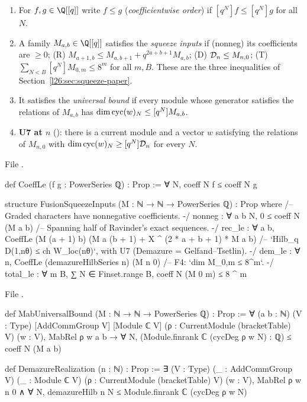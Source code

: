 \begin{definition}\label{l26:def:squeezeinputs}
\begin{enumerate}
\item[(a)] For $f,g\in\Q[[q]]$ write $f\le g$ (\emph{coefficientwise order}) if $[q^N]f\le[q^N]g$ for all $N$.
\item[(b)] A family $M_{a,b}\in\Q[[q]]$ satisfies the \emph{squeeze inputs} if (nonneg) its coefficients are $\ge0$;
(R) $M_{a+1,b}\le M_{a,b+1}+q^{2a+b+1}M_{a,b}$; (D) $\mathcal D_n\le M_{n,0}$; (T) $\sum_{N<B}[q^N]M_{0,m}\le8^m$ for all
$m,B$. These are the three inequalities of Section~\ref{l26:sec:squeeze-paper}.
\item[(c)] It satisfies the \emph{universal bound} if every module whose generator satisfies the relations of $M_{a,b}$ has
$\dim\operatorname{cyc}(w)_N\le[q^N]M_{a,b}$.
\item[(d)] \textbf{U7 at $n$} (): there is a current module and a vector $w$ satisfying the
relations of $M_{n,0}$ with $\dim\operatorname{cyc}(w)_N\ge[q^N]\mathcal D_n$ for every $N$.
\end{enumerate}
\end{definition}
\noindent File .
\begin{leancode}
def CoeffLe (f g : PowerSeries ℚ) : Prop := ∀ N, coeff N f ≤ coeff N g

structure FusionSqueezeInputs (M : ℕ → ℕ → PowerSeries ℚ) : Prop where
  /-- Graded characters have nonnegative coefficients. -/
  nonneg : ∀ a b N, 0 ≤ coeff N (M a b)
  /-- Spanning half of Ravinder's exact sequences. -/
  rec_le : ∀ a b, CoeffLe (M (a + 1) b) (M a (b + 1) + X ^ (2 * a + b + 1) * M a b)
  /-- `Hilb_q D(1,nθ) ≤ ch W_loc(nθ)`, with U7 (Demazure = Gelfand–Tsetlin). -/
  dem_le : ∀ n, CoeffLe (demazureHilbSeries n) (M n 0)
  /-- F4: `dim M_{0,m} ≤ 8^m`. -/
  total_le : ∀ m B, ∑ N ∈ Finset.range B, coeff N (M 0 m) ≤ 8 ^ m
\end{leancode}
\noindent File .
\begin{leancode}
def MabUniversalBound (M : ℕ → ℕ → PowerSeries ℚ) : Prop :=
  ∀ (a b : ℕ) (V : Type) [AddCommGroup V] [Module ℂ V] (ρ : CurrentModule (bracketTable) V)
    (w : V), MabRel ρ w a b → ∀ N, (Module.finrank ℂ (cycDeg ρ w N) : ℚ) ≤ coeff N (M a b)

def DemazureRealization (n : ℕ) : Prop :=
  ∃ (V : Type) (_ : AddCommGroup V) (_ : Module ℂ V) (ρ : CurrentModule (bracketTable) V) (w : V),
    MabRel ρ w n 0 ∧ ∀ N, demazureHilb n N ≤ Module.finrank ℂ (cycDeg ρ w N)
\end{leancode}

